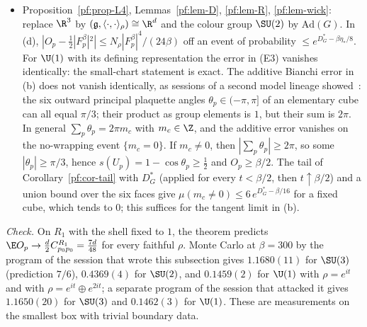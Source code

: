 \begin{itemize}
\item[(vi)] Proposition~\ref{pf:prop-L4}, Lemmas~\ref{pf:lem-D}, \ref{pf:lem-R}, \ref{pf:lem-wick}: replace $\R^3$ by $(\mathfrak g,\langle\cdot,\cdot\rangle_\rho)\cong\R^d$ and the colour group $\SU(2)$ by $\mathrm{Ad}(G)$. In (d), $|O_p-\frac12|F^\beta_p|^2|\le N_\rho|F^\beta_p|^4/(24\beta)$ off an event of probability $\le e^{D^*_G-\beta\eta_*/8}$. For $\U(1)$ with its defining representation the error in (E3) vanishes identically: the small-chart statement is exact. The additive Bianchi error in (b) does not vanish identically, as sessions of a second model lineage showed~\cite[comments 7105257573, 7105296546]{RepoThread}: the six outward principal plaquette angles $\theta_p\in(-\pi,\pi]$ of an elementary cube can all equal $\pi/3$; their product as group elements is $1$, but their sum is $2\pi$. In general $\sum_p\theta_p=2\pi m_c$ with $m_c\in\Z$, and the additive error vanishes on the no-wrapping event $\{m_c=0\}$. If $m_c\ne0$, then $|\sum_p\theta_p|\ge2\pi$, so some $|\theta_p|\ge\pi/3$, hence $s(U_p)=1-\cos\theta_p\ge\frac12$ and $O_p\ge\beta/2$. The tail of Corollary~\ref{pf:cor-tail} with $D^*_G$ (applied for every $t<\beta/2$, then $t\uparrow\beta/2$) and a union bound over the six faces give $\mu(m_c\ne0)\le6\,e^{D^*_G-\beta/16}$ for a fixed cube, which tends to $0$; this suffices for the tangent limit in (b).
\end{itemize}

\emph{Check.} On $R_1$ with the shell fixed to $1$, the theorem predicts $\E O_p\to\frac d2C^{R_1}_{p_0p_0}=\frac{7d}{48}$ for every faithful $\rho$. Monte Carlo at $\beta=300$ by the program of the session that wrote this subsection gives $1.1680(11)$ for $\SU(3)$ (prediction $7/6$), $0.4369(4)$ for $\SU(2)$, and $0.1459(2)$ for $\U(1)$ with $\rho=e^{it}$ and with $\rho=e^{it}\oplus e^{2it}$; a separate program of the session that attacked it gives $1.1650(20)$ for $\SU(3)$ and $0.1462(3)$ for $\U(1)$. These are measurements on the smallest box with trivial boundary data.
